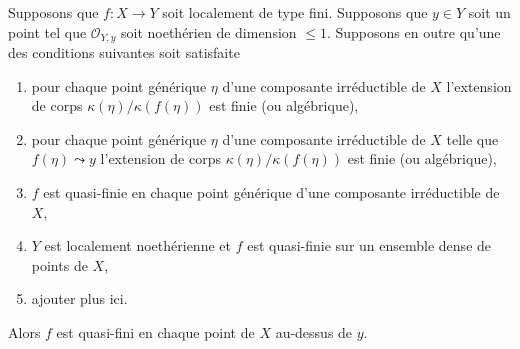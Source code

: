 \begin{lemma}
\label{lemma-quasi-finite-in-codim-1}
Supposons que $f : X \to Y$ soit localement de type fini. Supposons que $y
\in Y$ soit un point tel que $\mathcal{O}_{Y, y}$ soit noethérien de dimension
$\leq 1$. Supposons en outre qu'une des conditions suivantes soit satisfaite
\begin{enumerate}
\item pour chaque point générique $\eta$ d'une
composante irréductible de $X$ l'extension de corps
$\kappa(\eta)/\kappa(f(\eta))$ est finie (ou
algébrique), \item pour chaque point générique
$\eta$ d'une composante irréductible de $X$ telle
que $f(\eta) \leadsto y$ l'extension de corps
$\kappa(\eta)/\kappa(f(\eta))$ est finie (ou
algébrique), \item $f$ est quasi-finie en chaque point
générique d'une composante irréductible de $X$, \item $Y$
est localement noethérienne et $f$ est quasi-finie sur un
ensemble dense de points de $X$, \item ajouter plus ici.
\end{enumerate}
Alors $f$ est quasi-fini en chaque point de $X$ au-dessus de $y$.
\end{lemma}

